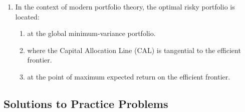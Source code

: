 \begin{enumerate}
	\item In the context of modern portfolio theory, the optimal risky portfolio is located:
	      \begin{enumerate}[label=\Alph*.]
		      \item at the global minimum-variance portfolio.
		      \item where the Capital Allocation Line (CAL) is tangential to the efficient frontier.
		      \item at the point of maximum expected return on the efficient frontier.
	      \end{enumerate}
\end{enumerate}

\subsection{Solutions to Practice Problems}
\label{subsec:app_Solutions_M8}

